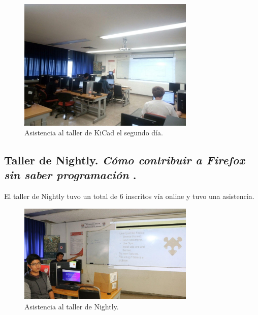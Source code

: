 \documentclass[a4paper,11pt]{article}                 %
\begin{document}
  \begin{figure}[H]
    \begin{center}
      \includegraphics[width=0.75\textwidth]{images/kicad-02}
      \caption{Asistencia al taller de KiCad el segundo día.}
      \label{fig:kicad-02}
    \end{center}
  \end{figure}   
  
  \subsection{Taller de Nightly. \textit{Cómo contribuir a Firefox sin saber programación }.}  
  
El taller de  Nightly tuvo un total de 6 inscritos vía online y tuvo una asistencia.

       \begin{figure}[H]
    \begin{center}
      \includegraphics[width=0.75\textwidth]{images/nightly-01}
      \caption{Asistencia al taller de Nightly.}
      \label{fig:nightly-01}
    \end{center}
  \end{figure} 
  
\end{document}
